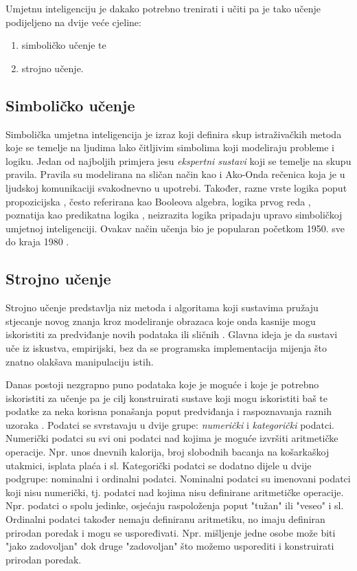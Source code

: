 \documentclass[times, utf8, zavrsni]{fer}
\begin{document}
Umjetnu inteligenciju je dakako potrebno trenirati i učiti pa je tako učenje podijeljeno na dvije veće cjeline:
\begin{center}
    \begin{enumerate}
        \item simboličko učenje te
        \item strojno učenje.
    \end{enumerate}
\end{center}

\subsection{Simboličko učenje}
Simbolička umjetna inteligencija  je izraz koji definira skup istraživačkih metoda koje se temelje na ljudima lako čitljivim simbolima  koji modeliraju probleme i logiku. Jedan od najboljih primjera jesu \textit{ekspertni sustavi} koji se temelje na skupu pravila. Pravila su modelirana na sličan način kao i Ako-Onda rečenica  koja je u ljudskoj komunikaciji svakodnevno u upotrebi. Također, razne vrste logika poput propozicijska , često referirana kao Booleova algebra, logika prvog reda , poznatija kao predikatna logika , neizrazita logika  pripadaju upravo simboličkoj umjetnoj inteligenciji. Ovakav način učenja bio je popularan početkom 1950. sve do kraja 1980 \citep{wiki:SIMB}.

\subsection{Strojno učenje}
Strojno učenje  predstavlja niz metoda i algoritama koji sustavima pružaju stjecanje novog znanja kroz modeliranje obrazaca koje onda kasnije mogu iskoristiti za predviđanje novih podataka ili sličnih \citep{cupicML}. Glavna ideja je da sustavi uče iz iskustva, empirijski, bez da se programska implementacija mijenja što znatno olakšava manipulaciju istih.

Danas postoji nezgrapno puno podataka koje je moguće i koje je potrebno iskoristiti za učenje pa je cilj konstruirati sustave koji mogu iskoristiti baš te podatke za neka korisna ponašanja poput predviđanja i raspoznavanja raznih uzoraka \citep{cupicML}. Podatci se svrstavaju u dvije grupe: \textit{numerički} i \textit{kategorički} podatci. Numerički podatci su svi oni podatci nad kojima je moguće izvršiti aritmetičke operacije. Npr. unos dnevnih kalorija, broj slobodnih bacanja na košarkaškoj utakmici, isplata plaća i sl. Kategorički podatci se dodatno dijele u dvije podgrupe: nominalni i ordinalni podatci. Nominalni podatci su imenovani podatci koji nisu numerički, tj. podatci nad kojima nisu definirane aritmetičke operacije. Npr. podatci o spolu jedinke, osjećaju raspoloženja poput "tužan" ili "veseo" i sl. Ordinalni podatci također nemaju definiranu aritmetiku, no imaju definiran prirodan poredak i mogu se uspoređivati. Npr. mišljenje jedne osobe može biti "jako zadovoljan" dok druge "zadovoljan" što možemo usporediti i konstruirati prirodan poredak.
\end{document}
